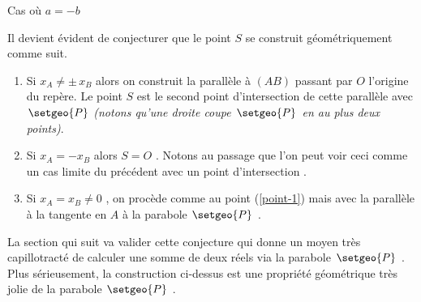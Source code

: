 \begin{center}
	\footnotesize
	\itshape

	
	\smallskip
	Cas où $a = -b$
\end{center}


\medskip

Il devient évident de conjecturer que le point $S$ se construit géométriquement comme suit.

\begin{enumerate}
	\item \label{point-1} Si $x_A \neq \pm \, x_B$ alors on construit la parallèle à $(AB)$ passant par $O$ l'origine du repère. Le point $S$ est le second point d'intersection de cette parallèle avec $\setgeo{P}$  \emph{(notons qu'une droite coupe $\setgeo{P}$ en au plus deux points)}.

	\item Si $x_A = - x_B$ alors $S = O$ . Notons au passage que l'on peut voir ceci comme un cas limite du précédent avec un point d'intersection .

	\item Si $x_A = x_B \neq 0$ , on procède comme au point (\ref{point-1}) mais avec la parallèle à la tangente en $A$ à la parabole $\setgeo{P}$ .
\end{enumerate}


La section qui suit va valider cette conjecture qui donne un moyen très capillotracté de calculer une somme de deux réels via la parabole $\setgeo{P}$ .
Plus sérieusement, la construction ci-dessus est une propriété géométrique très jolie de la parabole $\setgeo{P}$ .
